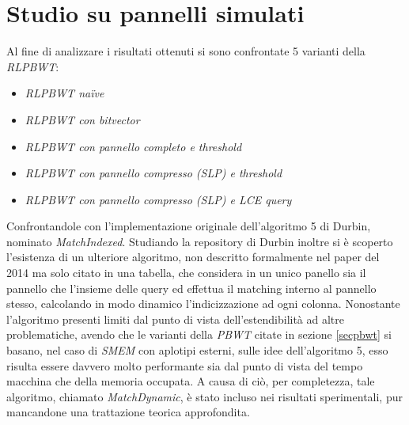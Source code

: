 \section{Studio su pannelli simulati}
Al fine di analizzare i risultati ottenuti si sono confrontate 5 varianti della
\textit{RLPBWT}:
\begin{itemize}
  \item \textit{RLPBWT na\"{i}ve}
  \item \textit{RLPBWT con bitvector}
  \item \textit{RLPBWT con pannello completo e threshold}
  \item \textit{RLPBWT con pannello compresso (SLP) e threshold}
  \item \textit{RLPBWT con pannello compresso (SLP) e LCE query}  
\end{itemize}
Confrontandole con l'implementazione originale dell'algoritmo 5 di Durbin,
nominato \textit{MatchIndexed}. Studiando la repository di Durbin inoltre si è
scoperto l'esistenza di un ulteriore algoritmo, non descritto
formalmente nel paper del 2014 \cite{pbwt} ma solo citato in una tabella, che
considera in un unico panello sia il pannello che l'insieme delle query ed
effettua il matching interno al pannello stesso, calcolando in modo dinamico
l'indicizzazione ad ogni colonna. Nonostante l'algoritmo presenti limiti dal
punto di vista dell'estendibilità ad altre problematiche, avendo che le varianti
della \textit{PBWT} citate in sezione \ref{secpbwt} si basano, nel caso di
\textit{SMEM} 
con aplotipi esterni, sulle idee dell'algoritmo 5, esso risulta essere davvero
molto performante sia dal punto di vista del tempo macchina che della memoria
occupata. A causa di ciò, per completezza, tale algoritmo, chiamato
\textit{MatchDynamic}, è stato incluso nei risultati sperimentali, pur
mancandone una trattazione teorica approfondita.
